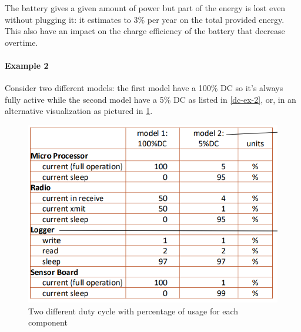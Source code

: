 \documentclass[10pt,a4paper]{report}
\theoremstyle{definition}
\begin{document}
The battery gives a given amount of power but part of the energy is lost even without plugging it: it estimates to 3\% per year on the total provided energy. This also have an impact on the charge efficiency of the battery that decrease overtime.
\paragraph{Example 2}\label{sec:dc-example-2}
Consider two different models: the first model have a 100\% DC so it's always fully active while the second model have a 5\% DC as listed in \ref{dc-ex-2}, or, in an alternative visualization as pictured in \ref{dc-ex-2-bis}.


\begin{figure}[h]
	\centering\includegraphics[scale=0.40]{images/Pasted image 20230324171652.png}
	\caption{Two different duty cycle with percentage of usage for each component}
	\label{dc-ex-2-bis}
\end{figure}
\end{document}
